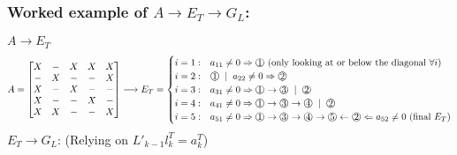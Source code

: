 \documentclass{article}
\newcommand*\circled[1]{\raisebox{.5pt}{\textcircled{\raisebox{-.9pt} {#1}}}}
\begin{document}
\subsubsection{Worked example of $A \longrightarrow E_T \longrightarrow G_L$:}
$A \longrightarrow E_T$
\begin{align*}
    A = \begin{bmatrix}
        X &- &X &X &X\\
        - &X &- &- &X\\
        X &- &X &- &-\\
        X &- & -& X &-\\
        X &X &- &- &X
    \end{bmatrix}
    \longrightarrow E_T = \begin{cases}
        i=1: & a_{11}\neq 0 \Rightarrow \circled{1} \textrm{ (only looking at or below the diagonal } \forall i)\\
        i=2: & \circled{1}\; \mid \; a_{22}\neq 0 \Rightarrow \circled{2}\\
        i=3: & a_{31}\neq 0 \Rightarrow \circled{1} \rightarrow \circled{3} \; \mid \; \circled{2}\\
        i=4: & a_{41} \neq 0 \Rightarrow \circled{1} \rightarrow \circled{3} \rightarrow \circled{4} \; \mid \; \circled{2}\\
        i=5: & a_{51} \neq 0 \Rightarrow \circled{1} \rightarrow \circled{3} \rightarrow \circled{4} \rightarrow \circled{5} \leftarrow \circled{2} \Leftarrow a_{52}\neq 0 \textrm{ (final $E_T$)}
    \end{cases}
\end{align*}
$E_T \longrightarrow G_L$: (Relying on $L'_{k-1}l_k^T = a_k^T$)
\end{document}
